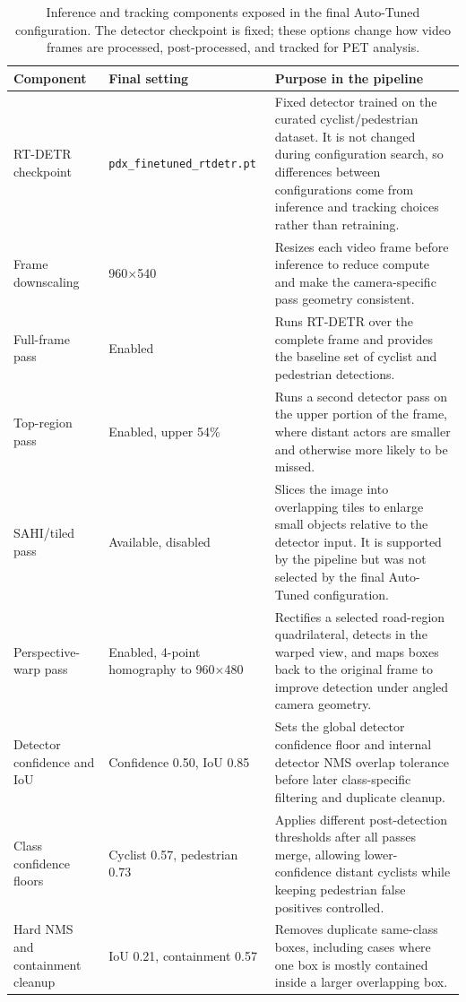 \documentclass[conference]{IEEEtran}
\begin{document}
\begin{table}[t]
\centering
\small
\caption{Inference and tracking components exposed in the final Auto-Tuned configuration. The detector checkpoint is fixed; these options change how video frames are processed, post-processed, and tracked for PET analysis.}
\label{tab:config_components}
\begin{tabularx}{\textwidth}{p{}p{}X}
\toprule
\textbf{Component} & \textbf{Final setting} & \textbf{Purpose in the pipeline} \\
\midrule
RT-DETR checkpoint & \texttt{pdx\_finetuned\_rtdetr.pt} & Fixed detector trained on the curated cyclist/pedestrian dataset. It is not changed during configuration search, so differences between configurations come from inference and tracking choices rather than retraining. \\
Frame downscaling & 960$\times$540 & Resizes each video frame before inference to reduce compute and make the camera-specific pass geometry consistent. \\
Full-frame pass & Enabled & Runs RT-DETR over the complete frame and provides the baseline set of cyclist and pedestrian detections. \\
Top-region pass & Enabled, upper 54\% & Runs a second detector pass on the upper portion of the frame, where distant actors are smaller and otherwise more likely to be missed. \\
SAHI/tiled pass & Available, disabled & Slices the image into overlapping tiles to enlarge small objects relative to the detector input. It is supported by the pipeline but was not selected by the final Auto-Tuned configuration. \\
Perspective-warp pass & Enabled, 4-point homography to 960$\times$480 & Rectifies a selected road-region quadrilateral, detects in the warped view, and maps boxes back to the original frame to improve detection under angled camera geometry. \\
Detector confidence and IoU & Confidence 0.50, IoU 0.85 & Sets the global detector confidence floor and internal detector NMS overlap tolerance before later class-specific filtering and duplicate cleanup. \\
Class confidence floors & Cyclist 0.57, pedestrian 0.73 & Applies different post-detection thresholds after all passes merge, allowing lower-confidence distant cyclists while keeping pedestrian false positives controlled. \\
Hard NMS and containment cleanup & IoU 0.21, containment 0.57 & Removes duplicate same-class boxes, including cases where one box is mostly contained inside a larger overlapping box. \\

\end{tabularx}
\end{table}
\end{document}
